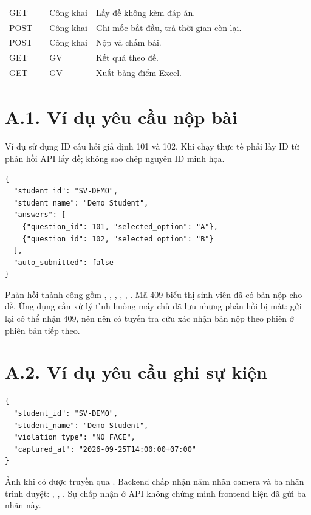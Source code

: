 \begin{longtable}{@{}L{1.9cm}L{6.9cm}L{1.8cm}L{3.9cm}@{}}
GET &  & Công khai & Lấy đề không kèm đáp án.\\
POST &  & Công khai & Ghi mốc bắt đầu, trả thời gian còn lại.\\
POST &  & Công khai & Nộp và chấm bài.\\
GET &  & GV & Kết quả theo đề.\\
GET &  & GV & Xuất bảng điểm Excel.\\
\bottomrule
\end{longtable}

\section*{A.1. Ví dụ yêu cầu nộp bài}
Ví dụ sử dụng ID câu hỏi giả định 101 và 102. Khi chạy thực tế phải lấy ID từ phản hồi API lấy đề; không sao chép nguyên ID minh họa.
\begin{lstlisting}[language={},caption={Cấu trúc JSON nộp bài minh họa}]
{
  "student_id": "SV-DEMO",
  "student_name": "Demo Student",
  "answers": [
    {"question_id": 101, "selected_option": "A"},
    {"question_id": 102, "selected_option": "B"}
  ],
  "auto_submitted": false
}
\end{lstlisting}
Phản hồi thành công gồm , , , , , . Mã 409 biểu thị sinh viên đã có bản nộp cho đề. Ứng dụng cần xử lý tình huống máy chủ đã lưu nhưng phản hồi bị mất: gửi lại có thể nhận 409, nên nên có tuyến tra cứu xác nhận bản nộp theo phiên ở phiên bản tiếp theo.

\section*{A.2. Ví dụ yêu cầu ghi sự kiện}
\begin{lstlisting}[language={},caption={Sự kiện minh họa không kèm ảnh}]
{
  "student_id": "SV-DEMO",
  "student_name": "Demo Student",
  "violation_type": "NO_FACE",
  "captured_at": "2026-09-25T14:00:00+07:00"
}
\end{lstlisting}
Ảnh khi có được truyền qua . Backend chấp nhận năm nhãn camera và ba nhãn trình duyệt: , , . Sự chấp nhận ở API không chứng minh frontend hiện đã gửi ba nhãn này.


